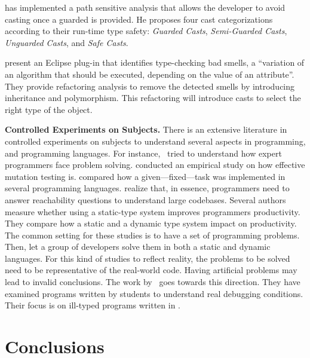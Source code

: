 \cite{wintherGuardedTypePromotion2011} has implemented a
path sensitive analysis that allows the developer to avoid casting
once a guarded  is provided.
He proposes four cast categorizations according to their
run-time type safety:
\emph{Guarded Casts}, \emph{Semi-Guarded Casts},
\emph{Unguarded Casts}, and \emph{Safe Casts}.

\cite{tsantalisJDeodorantIdentificationRemoval2008} present an
Eclipse plug-in that identifies type-checking bad smells,
a ``variation of an algorithm that should be executed,
depending on the value of an attribute''.
They provide refactoring analysis to remove the detected smells
by introducing inheritance and polymorphism.
This refactoring will introduce casts to select
the right type of the object.

\textbf{Controlled Experiments on Subjects.}
There is an extensive literature \perse{} in controlled experiments on subjects to understand several aspects in programming, and programming languages.
For instance,~\cite{solowayEmpiricalStudiesProgramming1984} tried to understand how expert programmers face problem solving.
\cite{buddTheoreticalEmpiricalStudies1980} conducted an empirical study on how effective mutation testing is.
\cite{precheltEmpiricalComparisonSeven2000} compared how a given---fixed---task was implemented in several programming languages.
\cite{latozaDevelopersAskReachability2010} realize that, in essence, programmers need to answer reachability questions to understand large codebases.
Several authors~\cite{stuchlikStaticVsDynamic2011,mayerEmpiricalStudyInfluence2012,harlinImpactUsingStaticType2017} measure whether using a static-type system improves programmers productivity.
They compare how a static and a dynamic type system impact on productivity.
The common setting for these studies is to have a set of programming problems.
Then, let a group of developers solve them in both a static and dynamic languages.
For this kind of studies to reflect reality, the problems to be solved need to be representative of the real-world code.
Having artificial problems may lead to invalid conclusions.
The work by~\cite{wuHowTypeErrors2017,wuLearningUserFriendly2017} goes towards this direction. 
They have examined programs written by students to understand real debugging conditions. 
Their focus is on ill-typed programs written in \haskell{}.

\section{Conclusions}
\label{sec:literature-review:conclusions}

